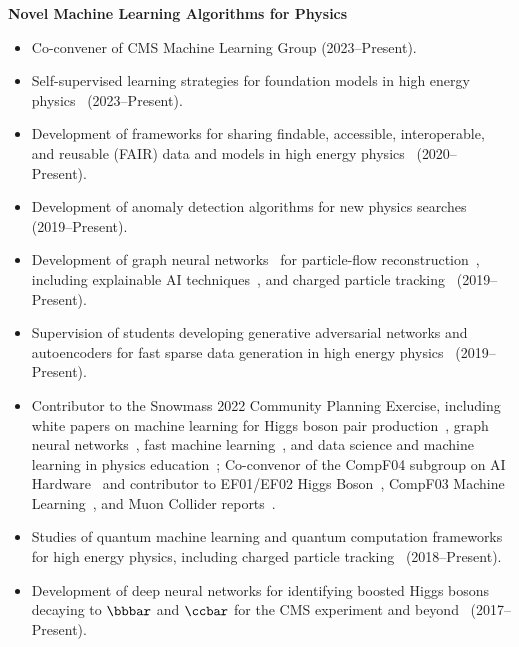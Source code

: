 \documentclass[11pt]{res}
\begin{document}
\begin{resume}
  \textbf{Novel Machine Learning Algorithms for Physics}
  \begin{itemize}
    \itemsep-0.3em
    \item Co-convener of CMS Machine Learning Group ({2023--Present}).
    \item Self-supervised learning strategies for foundation models in high energy physics~\cite{Zhao:2024kry,Li:2024htp} (2023--Present).
    \item Development of frameworks for sharing findable, accessible, interoperable, and reusable (FAIR) data and models in high energy physics~\cite{Kansal:2023joss,Huerta:2022kgj,Duarte:2022job,Chen:2021euv} ({2020--Present}).
    \item Development of anomaly detection algorithms for new physics searches~\cite{CMS-DP-2023-079,Hao:2022zns,Govorkova:2021utb,Jawahar:2021vyu,Aarrestad:2021oeb,Tsan:2021brw,Kasieczka:2021xcg,Wozniak:2020} ({2019--Present}).
    \item Development of graph neural networks~\cite{Chien:2024gnn,Duarte:2020ngm} for particle-flow reconstruction~\cite{Pata:2023rhh,Mokhtar:2023fzl,CMS-DP-2022-061,Pata:2022wam,CMS-DP-2021-030,Pata:2021oez}, including explainable AI techniques~\cite{Mokhtar:2022pwm,Mokhtar:2021bkf}, and charged particle tracking~\cite{Huang:2023bny,Elabd:2021lgo,Dezoort:2021kfk,Heintz:2020soy} ({2019--Present}).
    \item Supervision of students developing generative adversarial networks and autoencoders for fast sparse data generation in high energy physics~\cite{Li:2023xhj,Kansal:2022spb,Touranakou:2022qrp,Kansal:2021cqp,Orzari:2021suh,Kansal:2020svm} ({2019--Present}).
    \item Contributor to the Snowmass 2022 Community Planning Exercise, including white papers on machine learning for Higgs boson pair production~\cite{Apresyan:2022tqw}, graph neural networks~\cite{Thais:2022iok}, fast machine learning~\cite{Harris:2022qtm}, and data science and machine learning in physics education~\cite{Benelli:2022sqn}; Co-convenor of the CompF04 subgroup on AI Hardware~\cite{Bhimij:2022xyn} and contributor to EF01/EF02 Higgs Boson~\cite{Dawson:2022zbb}, CompF03 Machine Learning~\cite{Shanahan:2022ifi}, and Muon Collider reports~\cite{Black:2022cth}.
    \item Studies of quantum machine learning and quantum computation frameworks for high energy physics, including charged particle tracking~\cite{Zlokapa:2019tkn} ({2018--Present}).
    \item Development of deep neural networks for identifying boosted Higgs bosons decaying to $\bbbar$ and $\ccbar$ for the CMS experiment and beyond~\cite{CMS-DP-2022-041,Moreno:2019neq,Moreno:2019bmu,neurips2019_hbb,CMS-DP-2018-046} ({2017--Present}).
  \end{itemize}


\end{resume}
\end{document}
